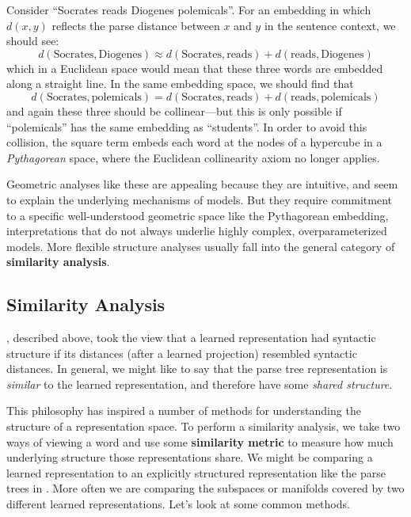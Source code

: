Consider ``Socrates reads Diogenes polemicals''. For an embedding in which $d(x,y)$ reflects the parse distance between $x$ and $y$ in the sentence context, we should see: 
$$
d(\text{Socrates}, \text{Diogenes}) \approx d(\text{Socrates}, \text{reads}) + d(\text{reads}, \text{Diogenes})
$$
which in a Euclidean space would mean that these three words are embedded along a straight line. In the same embedding space, we should find that 
$$
d(\text{Socrates}, \text{polemicals}) = d(\text{Socrates}, \text{reads}) + d(\text{reads}, \text{polemicals})
$$ 
and again these three should be collinear---but this is only possible if ``polemicals'' has the same embedding as ``students''. In order to avoid this collision, the square term embeds each word at the nodes of a hypercube in a \textit{Pythagorean} space, where the Euclidean collinearity axiom no longer applies.

Geometric analyses like these are appealing because they are intuitive, and seem to explain the underlying mechanisms of models. But they require commitment to a specific well-understood geometric space like the Pythagorean embedding, interpretations that do not always underlie highly complex, overparameterized models. More flexible structure analyses usually fall into the general category of \textbf{similarity analysis}.

\subsection{Similarity Analysis} \label{sec:interpretability_similarity_analysis}

\citet{hewitt_structural_2019}, described above, took the view that a learned representation had syntactic structure if its distances (after a learned projection) resembled syntactic distances. In general, we might like to say that the parse tree representation is \textit{similar} to the learned representation, and therefore have some \textit{shared structure}.

This philosophy has inspired a number of methods for understanding the structure of a representation space. To perform a similarity analysis, we take two ways of viewing a word and use some \textbf{similarity metric} to measure how much underlying structure those representations share. We might be comparing a learned representation to an explicitly structured representation like the parse trees in \citet{hewitt_structural_2019}.
More often we are comparing the subspaces or manifolds covered by two different learned representations. Let's look at some common methods.



